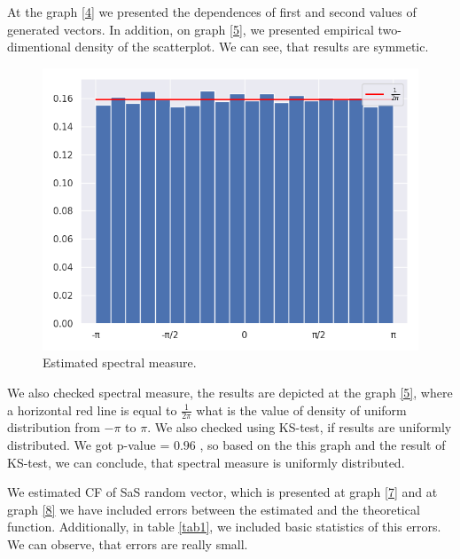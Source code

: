 \documentclass{article}
\begin{document}
	At the graph \ref{4} we presented the dependences of first and second values of generated vectors. In addition, on graph \ref{5}, we presented empirical two-dimentional density of the scatterplot. We can see, that results are symmetic. 

	\begin{figure}[H]
		\centering
		\includegraphics[width=0.8\linewidth]{images/ex_2_spectral_measure}
		\caption{Estimated spectral measure.}\label{6}
	\end{figure}

	We also checked spectral measure, the results are depicted at the graph \ref{5}, where a horizontal red line is equal to $\frac{1}{2 \pi}$ what is the value of density of uniform distribution from $-\pi$ to $\pi$. 
	We also checked using KS-test, if results are uniformly distributed. We got p-value = $0.96$ , so based on the this graph and the result of KS-test, we can conclude, that spectral measure is uniformly distributed.

	We estimated CF of SaS random vector, which is presented at graph \ref{7} and at graph \ref{8} we have included errors between the estimated and the theoretical function. Additionally, in table \ref{tab1}, we included basic statistics of this errors. We can observe, that errors are really small.
\end{document}
